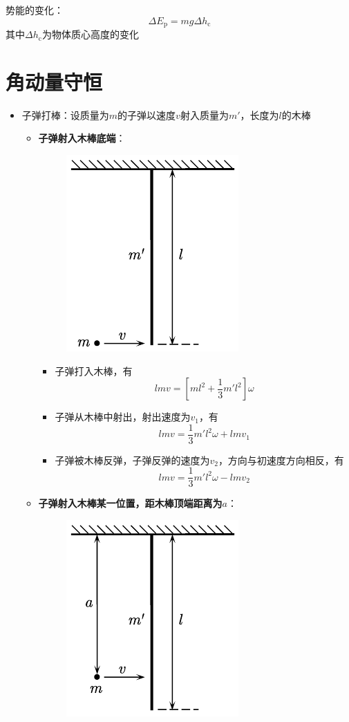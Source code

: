 \documentclass[12pt, a4paper, twoside]{ctexbook}
\begin{document}
{\sonti 势能的变化}：
$$
\Delta E_{\mathrm{p}}=mg\Delta h_{\mathrm{c}}
$$
其中$\Delta h_{\mathrm{c}}$为物体质心高度的变化
\newpage
\section{角动量守恒}
\begin{itemize}
    \item {\sonti 子弹打棒}：设质量为$m$的子弹以速度$v$射入质量为$m'$，长度为$l$的木棒
    \begin{itemize}
        \item \textbf{子弹射入木棒底端}：
        \begin{figure}[H]
            \centerline{\includegraphics[scale=0.88]{子弹打木块A.pdf}}
        \end{figure}
        \begin{itemize}
            \item 子弹打入木棒，有
            $$
            lmv=\left[ml^2+\frac{1}{3}m'l^2\right]\omega
            $$
            \item 子弹从木棒中射出，射出速度为$v_1$，有
            $$
            lmv=\frac{1}{3}m'l^2\omega+lmv_1
            $$
            \item 子弹被木棒反弹，子弹反弹的速度为$v_2$，方向与初速度方向相反，有
            $$
            lmv=\frac{1}{3}m'l^2\omega-lmv_2
            $$
        \end{itemize}
        \item \textbf{子弹射入木棒某一位置，距木棒顶端距离为}$a$：
        \begin{figure}[H]
            \centerline{\includegraphics[scale=0.88]{子弹打木块B.pdf}}

\end{figure}
\end{itemize}
\end{itemize}
\end{document}
